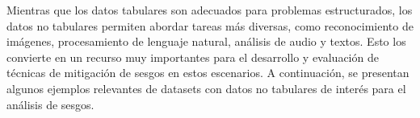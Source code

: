     Mientras que los datos tabulares son adecuados para problemas estructurados, los datos no tabulares permiten abordar tareas m\'as diversas, 
    como reconocimiento de im\'agenes, procesamiento de lenguaje natural, an\'alisis de audio y textos. Esto los convierte en un recurso muy importantes
    para el desarrollo y evaluaci\'on de t\'ecnicas de mitigaci\'on de sesgos en estos escenarios. A continuaci\'on, se presentan algunos ejemplos 
    relevantes de datasets con datos no tabulares de inter\'es para el an\'alisis de sesgos.

    \begin{table}[htpb]
        \centering
\end{table}
